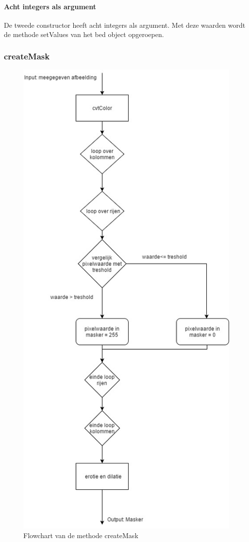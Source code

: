 \paragraph{Acht integers als argument}
De tweede constructor heeft acht integers als argument. Met deze waarden wordt de methode setValues van het bed object opgeroepen.

\subsubsection{createMask}
\begin{figure}[hbp]
	\includegraphics[scale=0.45]{FlowShart_createMask}
	\caption{Flowchart van de methode createMask}
	\label{imgFSCMa}
\end{figure}

